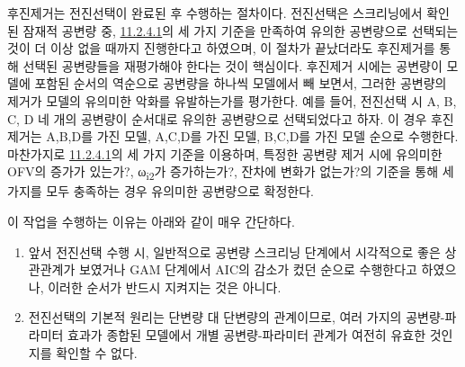 \documentclass[
  11pt,
  krantz2,
  a4paper]{krantz}
\providecommand{\tightlist}{%
  \setlength{\itemsep}{0pt}\setlength{\parskip}{0pt}}
\theoremstyle{definition}
\theoremstyle{definition}
\theoremstyle{definition}
\theoremstyle{remark}
\begin{document}

후진제거는 전진선택이 완료된 후 수행하는 절차이다. 전진선택은 스크리닝에서 확인된 잠재적 공변량 중, \protect\hyperlink{forward-sel-def}{11.2.4.1}의 세 가지 기준을 만족하여 유의한 공변량으로 선택되는 것이 더 이상 없을 때까지 진행한다고 하였으며, 이 절차가 끝났더라도 후진제거를 통해 선택된 공변량들을 재평가해야 한다는 것이 핵심이다. 후진제거 시에는 공변량이 모델에 포함된 순서의 역순으로 공변량을 하나씩 모델에서 빼 보면서, 그러한 공변량의 제거가 모델의 유의미한 악화를 유발하는가를 평가한다. 예를 들어, 전진선택 시 A, B, C, D 네 개의 공변량이 순서대로 유의한 공변량으로 선택되었다고 하자. 이 경우 후진 제거는 A,B,D를 가진 모델, A,C,D를 가진 모델, B,C,D를 가진 모델 순으로 수행한다. 마찬가지로 \protect\hyperlink{forward-sel-def}{11.2.4.1}의 세 가지 기준을 이용하며, 특정한 공변량 제거 시에 유의미한 OFV의 증가가 있는가?, ω\textsubscript{i2}가 증가하는가?, 잔차에 변화가 없는가?의 기준을 통해 세 가지를 모두 충족하는 경우 유의미한 공변량으로 확정한다.

이 작업을 수행하는 이유는 아래와 같이 매우 간단하다.

\begin{enumerate}
\def\labelenumi{\arabic{enumi}.}
\tightlist
\item
  앞서 전진선택 수행 시, 일반적으로 공변량 스크리닝 단계에서 시각적으로 좋은 상관관계가 보였거나 GAM 단계에서 AIC의 감소가 컸던 순으로 수행한다고 하였으나, 이러한 순서가 반드시 지켜지는 것은 아니다.
\item
  전진선택의 기본적 원리는 단변량 대 단변량의 관계이므로, 여러 가지의 공변량-파라미터 효과가 종합된 모델에서 개별 공변량-파라미터 관계가 여전히 유효한 것인지를 확인할 수 없다.
\end{enumerate}
\end{document}
